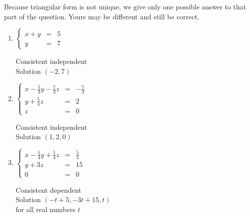 \documentclass{ximera}
\begin{document}
	\author{Stitz-Zeager}



Because triangular form is not unique, we give only one possible answer to that part of the question.  Yours may be different and still be correct.

\begin{enumerate}


\item $\left\{ \begin{array}{rcr} x + y & = & 5  \\ y & = & 7  \end{array} \right.$ 

Consistent independent\\
Solution $(-2, 7)$



\item $\left\{ \begin{array}{rcr} x - \frac{5}{3}y - \frac{7}{3}z & = & -\frac{7}{3} \\ [3pt] y + \frac{5}{4}z & = & 2 \\ z & = & 0  \end{array} \right.$

Consistent independent\\
Solution $(1, 2, 0)$



\item $\left\{ \begin{array}{rcr} x - \frac{1}{4}y + \frac{1}{4}z & = & \frac{5}{4} \\ [3pt] y + 3z & = & 15 \\ 0 & = & 0  \end{array} \right.$

Consistent dependent\\
Solution $(-t + 5, -3t + 15, t)$\\
for all real numbers $t$



\end{enumerate}
\end{document}
